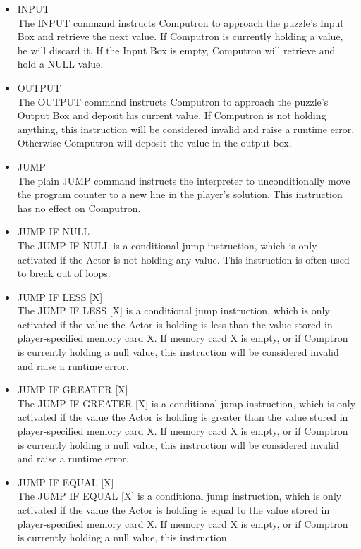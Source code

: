 \begin{itemize}
 	\item INPUT\\
	The INPUT command instructs Computron to approach the puzzle's Input Box and 
	retrieve the next value. If Computron is currently holding a value, he will discard it. 
	If the Input Box is empty, Computron will retrieve and hold a NULL value.
	\item OUTPUT\\
	The OUTPUT command instructs Computron to approach the puzzle's Output Box 
	and deposit his current value. If Computron is not holding anything, this instruction 
	will be considered invalid and raise a runtime error. Otherwise Computron will deposit 
	the value in the output box.
	\item JUMP\\
	The plain JUMP command instructs the interpreter to unconditionally move the program 
	counter to a new line in the player's solution. This instruction has no effect on Computron.
	\item JUMP IF NULL\\
	The JUMP IF NULL is a conditional jump instruction, which is only activated if the Actor
	 is not holding any value. This instruction is often used to break out of loops.
	\item JUMP IF LESS [X]\\
	The JUMP IF LESS [X] is a conditional jump instruction, which is only activated if the 
	value the Actor is holding is less than the value stored in player-specified memory card X. If 
	memory card X is empty, or if Comptron is currently holding a null value, this instruction 
           will be considered invalid and raise a runtime error.
	\item JUMP IF GREATER [X]\\
	The JUMP IF GREATER [X] is a conditional jump instruction, which is only activated if 
	the value the Actor is holding is greater than the value stored in player-specified memory card 
	X. If memory card X is empty, or if Comptron is currently holding a null value, this instruction 
           will be considered invalid and raise a runtime error.
	\item JUMP IF EQUAL [X]\\
	The JUMP IF EQUAL [X] is a conditional jump instruction, which is only activated if 
	the value the Actor is holding is equal to the value stored in player-specified memory card 
	X. If memory card X is empty, or if Comptron is currently holding a null value, this instruction 

\end{itemize}
